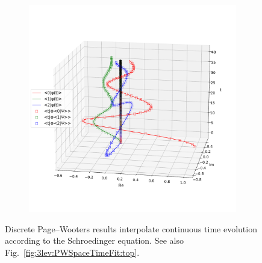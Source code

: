 \begin{figure}[h]
  \begin{subfigure}{\textwidth}
      \centering
      \includegraphics[width=\textwidth]{img/3ldetect/PWSpaceTimeFit_side.pdf}
      \label{fig:3lev:PWSpaceTimeFit:side}
  \end{subfigure}
  \caption{
    Discrete Page--Wooters results
    interpolate
    continuous time evolution according to the Schroedinger equation.
    See also Fig.~\ref{fig:3lev:PWSpaceTimeFit:top}.
  }
\end{figure}
